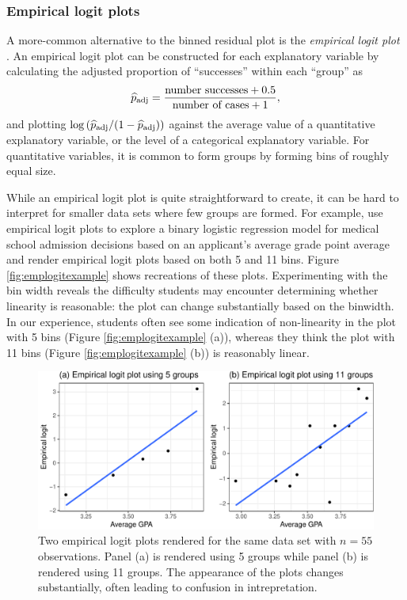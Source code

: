 \documentclass[12pt]{article}
\begin{document}
\hypertarget{empirical-logit-plots}{%
\subsubsection{Empirical logit plots}\label{empirical-logit-plots}}

A more-common alternative to the binned residual plot is the
\emph{empirical logit plot} \citep[c.f.,][]{stat2, ramsey2013}. An
empirical logit plot can be constructed for each explanatory variable by
calculating the adjusted proportion of ``successes'' within each
``group'' as \[
\widehat{p}_{\rm adj} = \frac{\text{number successes} + 0.5}{\text{number of cases} + 1},
\] and plotting
\(\log\left(\widehat{p}_{\rm adj} / (1- \widehat{p}_{\rm adj}) \right)\)
against the average value of a quantitative explanatory variable, or the
level of a categorical explanatory variable. For quantitative variables,
it is common to form groups by forming bins of roughly equal size.

While an empirical logit plot is quite straightforward to create, it can
be hard to interpret for smaller data sets where few groups are formed.
For example, \citet{stat2} use empirical logit plots to explore a binary
logistic regression model for medical school admission decisions based
on an applicant's average grade point average and render empirical logit
plots based on both 5 and 11 bins. Figure \ref{fig:emplogitexample}
shows recreations of these plots. Experimenting with the bin width
reveals the difficulty students may encounter determining whether
linearity is reasonable: the plot can change substantially based on the
binwidth. In our experience, students often see some indication of
non-linearity in the plot with 5 bins (Figure \ref{fig:emplogitexample}
(a)), whereas they think the plot with 11 bins (Figure
\ref{fig:emplogitexample} (b)) is reasonably linear.

\begin{figure}

{\centering \includegraphics[width=0.85\linewidth]{unnamed-chunk-7-1} 

}

\caption{\label{fig:emplogitexample} Two empirical logit plots rendered for the same data set with $n=55$ observations. Panel (a) is rendered using 5 groups while panel (b) is rendered using 11 groups. The appearance of the plots changes substantially, often leading to confusion in intrepretation.}\label{fig:unnamed-chunk-7}
\end{figure}
\end{document}
